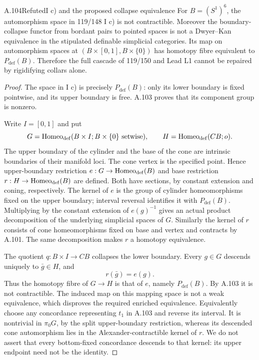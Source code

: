 \begin{saresult}{A.104}{Refuted}{I c) and the proposed collapse equivalence}
For $B=(S^1)^6$, the automorphism space in 119/148 I c) is not
contractible. Moreover the boundary-collapse functor from bordant pairs
to pointed spaces is not a Dwyer--Kan equivalence in the stipulated
definable simplicial categories. Its map on automorphism spaces at
$(B\times[0,1],B\times\{0\})$ has homotopy fibre equivalent to
$P_{\mathrm{def}}(B)$. Therefore the full cascade of 119/150 and Lead
L1 cannot be repaired by rigidifying collars alone.
\end{saresult}
\begin{proof}
The space in I c) is precisely $P_{\mathrm{def}}(B)$: only its lower
boundary is fixed pointwise, and its upper boundary is free.
A.103 proves that its component group is nonzero.

Write $I=[0,1]$ and put
\[
 G=\operatorname{Homeo}_{\mathrm{def}}(B\times I;B\times\{0\}\text{ setwise}),
 \qquad H=\operatorname{Homeo}_{\mathrm{def}}(CB;o).
\]
The upper boundary of the cylinder and the base of the cone are
intrinsic boundaries of their manifold loci. The cone vertex is the
specified point. Hence upper-boundary restriction
$e:G\to\operatorname{Homeo}_{\mathrm{def}}(B)$ and base restriction
$r:H\to\operatorname{Homeo}_{\mathrm{def}}(B)$ are defined. Both have sections,
by constant extension and coning, respectively.
The kernel of $e$ is the group of cylinder homeomorphisms fixed on the
upper boundary; interval reversal identifies it with $P_{\mathrm{def}}(B)$.
Multiplying by the constant extension of $e(g)^{-1}$ gives an actual
product decomposition of the underlying simplicial spaces of $G$.
Similarly the kernel of $r$ consists of cone homeomorphisms fixed on
base and vertex and contracts by A.101. The same decomposition makes
$r$ a homotopy equivalence.

The quotient $q:B\times I\to CB$ collapses the lower boundary.
Every $g\in G$ descends uniquely to $\bar g\in H$, and
\[
 r(\bar g)=e(g).
\]
Thus the homotopy fibre of $G\to H$ is that of $e$, namely
$P_{\mathrm{def}}(B)$. By A.103 it is not contractible. The induced
map on this mapping space is not a weak equivalence, which disproves
the required enriched equivalence.
Equivalently choose any concordance representing $t_1$ in A.103 and
reverse its interval. It is nontrivial in $\pi_0G$, by the split
upper-boundary restriction, whereas its descended cone automorphism
lies in the Alexander-contractible kernel of $r$.
We do not assert that every bottom-fixed concordance descends to that
kernel: its upper endpoint need not be the identity.
\end{proof}


